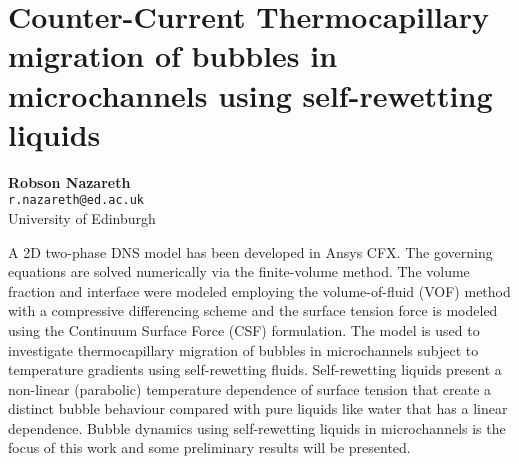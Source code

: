 
\section{Counter-Current Thermocapillary migration of bubbles in microchannels using self-rewetting liquids}

\textbf{Robson Nazareth}\\
\texttt{\small{r.nazareth@ed.ac.uk}}\\
University of Edinburgh

A 2D two-phase DNS model has been developed in Ansys CFX. The governing equations are solved numerically via the finite-volume method. The volume fraction and interface were modeled employing the volume-of-fluid (VOF) method with a compressive differencing scheme and the surface tension force is modeled using the Continuum Surface Force (CSF) formulation. The model is used to investigate thermocapillary migration of bubbles in microchannels subject to temperature gradients using self-rewetting fluids. Self-rewetting liquids present a non-linear (parabolic) temperature dependence of surface tension that create a distinct bubble behaviour compared with pure liquids like water that has a linear dependence. Bubble dynamics using self-rewetting liquids in microchannels is the focus of this work and some preliminary results will be presented.

